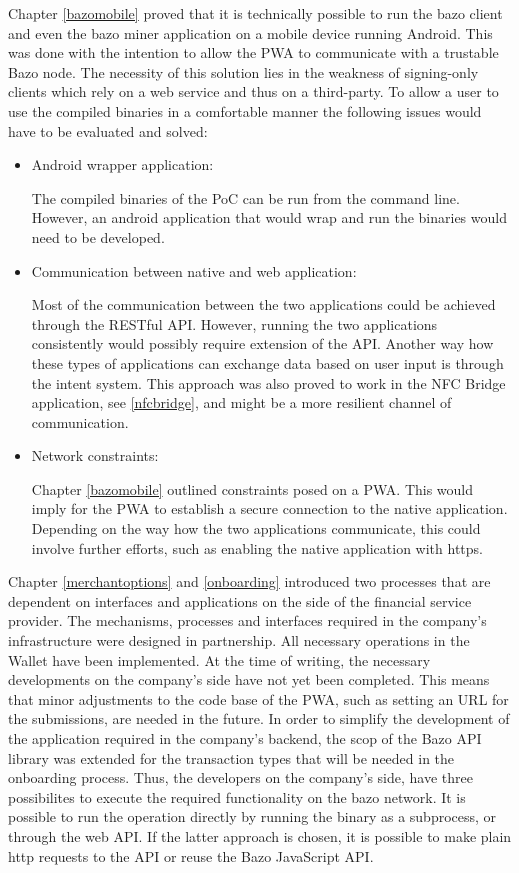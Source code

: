 Chapter \ref{bazomobile} proved that it is technically possible to run the bazo client and even the bazo miner application on a mobile device running Android. This was done with the intention to allow the PWA to communicate with a trustable Bazo node. The necessity of this solution lies in the weakness of signing-only clients which rely on a web service and thus on a third-party. To allow a user to use the compiled binaries in a comfortable manner the following issues would have to be evaluated and solved:
\begin{itemize}
\item Android wrapper application:

The compiled binaries of the PoC can be run from the command line. However, an android application that would wrap and run the binaries would need to be developed.
\item Communication between native and web application:

Most of the communication between the two applications could be achieved through the RESTful API. However, running the two applications consistently would possibly require extension of the API. Another way how these types of applications can exchange data based on user input is through the intent system. This approach was also proved to work in the NFC Bridge application, see \ref{nfcbridge}, and might be a more resilient channel of communication.
\item Network constraints:

Chapter \ref{bazomobile} outlined constraints posed on a PWA. This would imply for the PWA to establish a secure connection to the native application. Depending on the way how the two applications communicate, this could involve further efforts, such as enabling the native application with https.
\end{itemize}

Chapter \ref{merchantoptions} and \ref{onboarding} introduced two processes that are dependent on interfaces and applications on the side of the financial service provider. The mechanisms, processes and interfaces required in the company's infrastructure were designed in partnership. All necessary operations in the Wallet have been implemented. At the time of writing, the necessary developments on the company's side have not yet been completed. This means that minor adjustments to the code base of the PWA, such as setting an URL for the submissions, are needed in the future. In order to simplify the development of the application required in the company's backend, the scop of the Bazo API library was extended for the transaction types that will be needed in the onboarding process. Thus, the developers on the company's side, have three possibilites to execute the required functionality on the bazo network. It is possible to run the operation directly by running the binary as a subprocess, or through the web API. If the latter approach is chosen, it is possible to make plain http requests to the API or reuse the Bazo JavaScript API.
